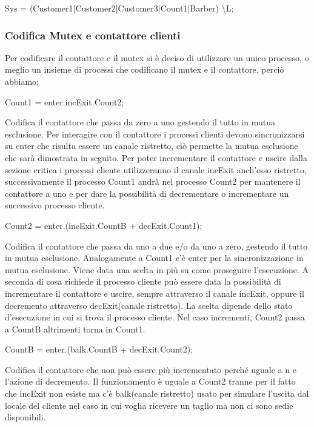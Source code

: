 \textsf{Sys = (Customer1|Customer2|Customer3|Count1|Barber) \textbackslash L;}

\subsubsection{Codifica Mutex e contattore clienti}

Per codificare il contattore e il \textsf{mutex} si è deciso di utilizzare un unico processo, o meglio un insieme di processi che codificano il \textsf{mutex} e il contattore, perciò abbiamo: 

\textsf{Count1 = enter.incExit.Count2;}

Codifica il contattore che passa da zero a uno gestendo il tutto in mutua esclusione. Per interagire con il contattore i processi clienti devono sincronizzarsi su \textsf{enter} che risulta essere un canale ristretto, ciò permette la mutua esclusione che sarà dimostrata in seguito. Per poter incrementare il contattore e uscire dalla sezione critica i processi cliente utilizzeranno il canale \textsf{incExit} anch'esso ristretto, successivamente il processo \textsf{Count1} andrà nel processo \textsf{Count2} per mantenere il contattore a uno e per dare la possibilità di decrementare o incrementare un successivo processo cliente.

\textsf{Count2 = enter.(incExit.CountB + decExit.Count1);}

Codifica il contattore che passa da uno a due e/o da uno a zero, gestendo il tutto in mutua esclusione. Analogamente a \textsf{Count1} c'è \textsf{enter} per la sincronizzazione in mutua esclusione. Viene data una scelta in più su come proseguire l'esecuzione. A seconda di cosa richiede il processo cliente può essere data la possibilità di incrementare il contattore e uscire, sempre attraverso il canale \textsf{incExit}, oppure il decremento attraverso \textsf{decExit}(canale ristretto). La scelta dipende dello stato d'esecuzione in cui si trova il processo cliente. Nel caso incrementi, \textsf{Count2} passa a \textsf{CountB} altrimenti torna in \textsf{Count1}.

\textsf{CountB = enter.(balk.CountB + decExit.Count2);}

Codifica il contattore che non può essere più incrementato perché uguale a n e l'azione di decremento. Il funzionamento è uguale a \textsf{Count2} tranne per il fatto che \textsf{incExit} non esiste ma c'è \textsf{balk}(canale ristretto) usato per simulare l'uscita dal locale del cliente nel caso in cui voglia ricevere un taglio ma non ci sono sedie disponibili.

